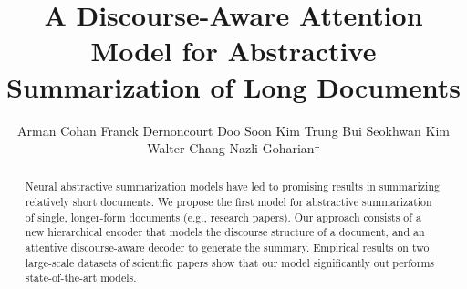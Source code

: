 \documentclass[aps,floatfix,prd,showpacs,twocolumn]{revtex4}
\begin{document}
\title{A Discourse-Aware Attention Model for
Abstractive Summarization of Long Documents}
\author{
Arman Cohan
Franck Dernoncourt
Doo Soon Kim
Trung Bui
Seokhwan Kim 
Walter Chang
Nazli Goharian†
}

\date{}

\begin{abstract}
Neural abstractive summarization models have
led to promising results in summarizing relatively short documents. We propose the first
model for abstractive summarization of single,
longer-form documents (e.g., research papers).
Our approach consists of a new hierarchical
encoder that models the discourse structure of
a document, and an attentive discourse-aware
decoder to generate the summary. Empirical
results on two large-scale datasets of scientific
papers show that our model significantly outperforms state-of-the-art models. 
\end{abstract}
\end{document}
